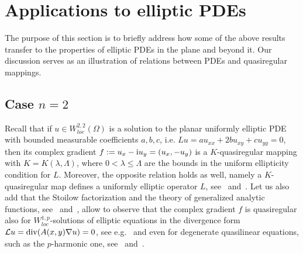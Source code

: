 \documentclass[11pt,a4paper,reqno]{amsart}
\newtheorem{cor}[theorem]{Corollary}
\theoremstyle{definition}
\newcommand{\Om}{\Omega}
\newcommand{\B}{\mathbb{B}^n}
\newcommand{\Rn}{{\mathbb R}^n}
\numberwithin{komcounter}{section}
\begin{document}
%


\section{Applications to elliptic PDEs}

The purpose of this section is to briefly address how some of the above results transfer to the properties of elliptic PDEs in the plane and beyond it. Our discussion serves as an illustration of relations between PDEs and quasiregular mappings.

\subsection{Case $n=2$} Recall that if $u\in W^{2,2}_{loc}(\Om)$ is a solution to the planar uniformly elliptic PDE with bounded measurable coefficients $a, b, c$, i.e. $Lu=au_{xx}+2bu_{xy}+cu_{yy}=0$, then its complex gradient $f:=u_x-{\rm i}u_y=(u_x,-u_y)$ is a $K$-quasiregular mapping with $K=K(\lambda,\Lambda)$, where $0<\lambda\leq \Lambda$ are the bounds in the uniform ellipticity condition for $L$. Moreover, the opposite relation holds as well, namely a $K$-quasiregular map defines a uniformly elliptic operator $L$, see~\cite[Chapter 12]{gt} and~\cite[Theorem 3]{man}. Let us also add that the Stoilow factorization and the theory of generalized analytic functions, see~\cite{vek} and~\cite[Chapter 6]{bjs}, allow to observe that the complex gradient $f$ is quasiregular also for $W^{1, p}_{loc}$-solutions of elliptic equations in the divergence form $\mathcal{L}u={\rm div}(A(x,y) \nabla u)=0$, see e.g.~\cite[Section 2.3]{mag} and even for degenerate quasilinear equations, such as the $p$-harmonic one, see~\cite{man, arli} and~\cite[Chapter 16]{aim}.  
\end{document}
